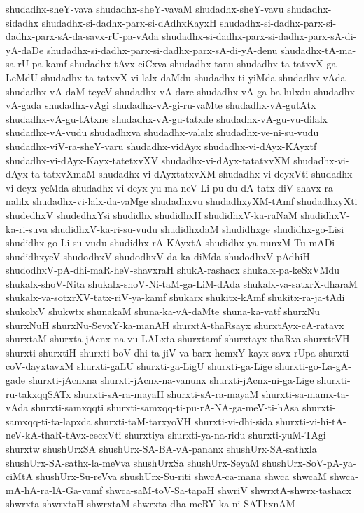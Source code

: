 {shudadhx-sheY-vava
shudadhx-sheY-vavaM
shudadhx-sheY-vavu
shudadhx-sidadhx
shudadhx-si-dadhx-parx-si-dAdhxKayxH
shudadhx-si-dadhx-parx-si-dadhx-parx-sA-da-savx-rU-pa-vAda
shudadhx-si-dadhx-parx-si-dadhx-parx-sA-di-yA-daDe
shudadhx-si-dadhx-parx-si-dadhx-parx-sA-di-yA-denu
shudadhx-tA-ma-sa-rU-pa-kamf
shudadhx-tAvx-ciCxva
shudadhx-tanu
shudadhx-ta-tatxvX-ga-LeMdU
shudadhx-ta-tatxvX-vi-lalx-daMdu
shudadhx-ti-yiMda
shudadhx-vAda
shudadhx-vA-daM-teyeV
shudadhx-vA-dare
shudadhx-vA-ga-ba-lulxdu
shudadhx-vA-gada
shudadhx-vAgi
shudadhx-vA-gi-ru-vaMte
shudadhx-vA-gutAtx
shudadhx-vA-gu-tAtxne
shudadhx-vA-gu-tatxde
shudadhx-vA-gu-vu-dilalx
shudadhx-vA-vudu
shudadhxva
shudadhx-valalx
shudadhx-ve-ni-su-vudu
shudadhx-viV-ra-sheY-varu
shudadhx-vidAyx
shudadhx-vi-dAyx-KAyxtf
shudadhx-vi-dAyx-Kayx-tatetxvXV
shudadhx-vi-dAyx-tatatxvXM
shudadhx-vi-dAyx-ta-tatxvXmaM
shudadhx-vi-dAyxtatxvXM
shudadhx-vi-deyxVti
shudadhx-vi-deyx-yeMda
shudadhx-vi-deyx-yu-ma-neV-Li-pu-du-dA-tatx-diV-shavx-ra-nalilx
shudadhx-vi-lalx-da-vaMge
shudadhxvu
shudadhxyXM-tAmf
shudadhxyXti
shudedhxV
shudedhxYsi
shudidhx
shudidhxH
shudidhxV-ka-raNaM
shudidhxV-ka-ri-suva
shudidhxV-ka-ri-su-vudu
shudidhxdaM
shudidhxge
shudidhx-go-Lisi
shudidhx-go-Li-su-vudu
shudidhx-rA-KAyxtA
shudidhx-ya-nunxM-Tu-mADi
shudidhxyeV
shudodhxV
shudodhxV-da-ka-diMda
shudodhxV-pAdhiH
shudodhxV-pA-dhi-maR-heV-shavxraH
shukA-rashacx
shukalx-pa-keSxVMdu
shukalx-shoV-Nita
shukalx-shoV-Ni-taM-ga-LiM-dAda
shukalx-va-satxrX-dharaM
shukalx-va-sotxrXV-tatx-riV-ya-kamf
shukarx
shukitx-kAmf
shukitx-ra-ja-tAdi
shukolxV
shukwtx
shunakaM
shuna-ka-vA-daMte
shuna-ka-vatf
shurxNu
shurxNuH
shurxNu-SevxY-ka-manAH
shurxtA-thaRsayx
shurxtAyx-cA-ratavx
shurxtaM
shurxta-jAcnx-na-vu-LALxta
shurxtamf
shurxtayx-thaRva
shurxteVH
shurxti
shurxtiH
shurxti-boV-dhi-ta-jiV-va-barx-hemxY-kayx-savx-rUpa
shurxti-coV-dayxtavxM
shurxti-gaLU
shurxti-ga-LigU
shurxti-ga-Lige
shurxti-go-La-gA-gade
shurxti-jAcnxna
shurxti-jAcnx-na-vanunx
shurxti-jAcnx-ni-ga-Lige
shurxti-ru-takxqqSATx
shurxti-sA-ra-mayaH
shurxti-sA-ra-mayaM
shurxti-sa-mamx-ta-vAda
shurxti-samxqqti
shurxti-samxqq-ti-pu-rA-NA-ga-meV-ti-hAsa
shurxti-samxqq-ti-ta-lapxda
shurxti-taM-tarxyoVH
shurxti-vi-dhi-sida
shurxti-vi-hi-tA-neV-kA-thaR-tAvx-cecxVti
shurxtiya
shurxti-ya-na-ridu
shurxti-yuM-TAgi
shurxtw
shushUrxSA
shushUrx-SA-BA-vA-pananx
shushUrx-SA-sathxla
shushUrx-SA-sathx-la-meVva
shushUrxSa
shushUrx-SeyaM
shushUrx-SoV-pA-ya-ciMtA
shushUrx-Su-reVva
shushUrx-Su-riti
shwcA-ca-mana
shwca
shwcaM
shwca-mA-hA-ra-lA-Ga-vamf
shwca-saM-toV-Sa-tapaH
shwriV
shwrxtA-shwrx-tashacx
shwrxta
shwrxtaH
shwrxtaM
shwrxta-dha-meRY-ka-ni-SAThxnAM
}
